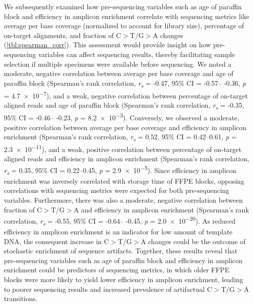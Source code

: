 We subsequently examined how pre-sequencing variables such as age of paraffin block and efficiency in amplicon enrichment correlate with sequencing metrics like average per base coverage (normalized to account for library size), percentage of on-target alignments, and fraction of C$>$T/G$>$A changes (\autoref{tbl:spearman_corr}). This assessment would provide insight on how pre-sequencing variables can affect sequencing results, thereby facilitating sample selection if multiple specimens were available before sequencing. We noted a moderate, negative correlation between average per base coverage and age of paraffin block (Spearman's rank correlation, \textit{r\textsubscript{s}} = -0.47, 95\% CI = -0.57-- -0.36, \textit{p} = \num{4.7e-7}), and a weak, negative correlation between percentage of on-target aligned reads and age of paraffin block (Spearman's rank correlation, \textit{r\textsubscript{s}} = -0.35, 95\% CI = -0.46-- -0.23, \textit{p} = \num{8.2e-3}). Conversely, we observed a moderate, positive correlation between average per base coverage and efficiency in amplicon enrichment (Spearman's rank correlation, \textit{r\textsubscript{s}} = 0.52, 95\% CI = 0.42--0.61, \textit{p} = \num{2.3e-11}), and a weak, positive correlation between percentage of on-target aligned reads and efficiency in amplicon enrichment (Spearman's rank correlation, \textit{r\textsubscript{s}} = 0.35, 95\% CI = 0.22--0.45, \textit{p} = \num{2.9e-5}). Since efficiency in amplicon enrichment was inversely correlated with storage time of FFPE blocks, opposing correlations with sequencing metrics were expected for both pre-sequencing variables. Furthermore, there was also a moderate, negative correlation between fraction of C$>$T/G$>$A and efficiency in amplicon enrichment (Spearman's rank correlation, \textit{r\textsubscript{s}} = -0.55, 95\% CI = -0.64-- -0.45, \textit{p} = \num{2.0e-20}). As reduced efficiency in amplicon enrichment is an indicator for low amount of template DNA, the consequent increase in C$>$T/G$>$A changes could be the outcome of stochastic enrichment of sequence artifacts. Together, these results reveal that pre-sequencing variables such as age of paraffin block and efficiency in amplicon enrichment could be predictors of sequencing metrics, in which older FFPE blocks were more likely to yield lower efficiency in amplicon enrichment, leading to poorer sequencing results and increased prevalence of artifactual C$>$T/G$>$A transitions.


